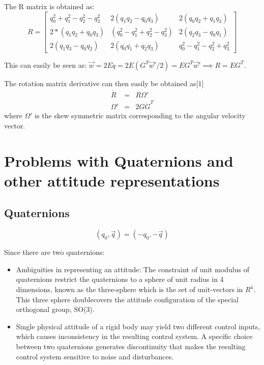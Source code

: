 \documentclass{article}
\begin{document}
		The R matrix is obtained as:
		\begin{equation}
		R = \begin{bmatrix}
		q_0^2+q_1^2-q_2^2-q_3^2 &   2(q_1q_2-q_0q_3)   &      2(q_0q_2+q_1q_3)\\
		2*(q_1q_2+q_0q_3)&   (q_0^2-q_1^2+q_2^2-q_3^2) &   2(q_2q_3-q_0q_1)\\
		2(q_1q_3-q_0q_2) &    2(q_0q_1+q_2q_3)        & q_0^2-q_1^2-q_2^2+q_3^2		
		\end{bmatrix}		
		\end{equation}	
		
		This can easily be seen as: $\vec{w}=2E\dot{q}=2E(G^T\vec{w}'/2) = EG^T\vec{w}'\implies R=EG^T$.
		
		The rotation matrix derivative can then easily be obtained as[1]
		\begin{eqnarray}
			\dot{R} &=& R\Omega'\\
			\Omega' &=& 2G\dot{G}^T
		\end{eqnarray}
		where $\Omega'$ is the skew symmetric matrix corresponding to the angular velocity vector. 
	
	
	
	\section{Problems with Quaternions and other attitude representations}
	
	\subsection{Quaternions}
	\begin{equation*}
	(q_0,\vec{q}) = (-q_0,-\vec{q})
	\end{equation*}
	
	Since there are two quaternions:
		\begin{itemize}
			\item Ambiguities in representing an attitude: The constraint of unit modulus of quaternions restrict the quaternions to a sphere of unit radius in 4 dimensions, known as the three-sphere which is the set of unit-vectors in $R^4$. This three sphere doublecovers the attitude configuration of the special orthogonal group, SO(3).
			\item Single physical attitude of a rigid body may yield two different control inputs, which causes inconsistency in the resulting control system. A specific choice between two quaternions generates discontinuity that makes the resulting control system sensitive to noise and disturbances.
		\end{itemize}
		
\end{document}
